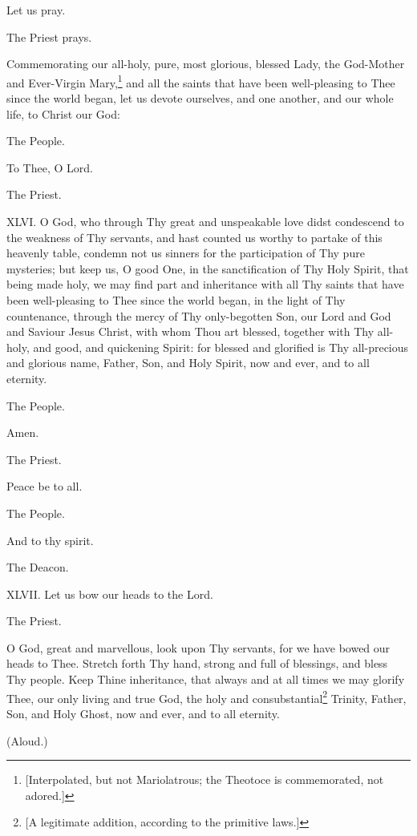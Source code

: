 Let us pray.

The Priest prays.

Commemorating our all-holy, pure, most glorious, blessed Lady, the God-Mother and Ever-Virgin Mary,\footnote{\par{}  [Interpolated, but not Mariolatrous; the Theotoce is commemorated, not adored.]} and all the saints that have been well-pleasing to Thee since the world began, let us devote ourselves, and one another, and our whole life, to Christ our God:

The People.

To Thee, O Lord.

The Priest.

XLVI. O God, who through Thy great and unspeakable love didst condescend to the weakness of Thy servants, and hast counted us worthy to partake of this heavenly table, condemn not us sinners for the participation of Thy pure mysteries; but keep us, O good One, in the sanctification of Thy Holy Spirit, that being made holy, we may find part and inheritance with all Thy saints that have been well-pleasing to Thee since the world began, in the light of Thy countenance, through the mercy of Thy only-begotten Son, our Lord and God and Saviour Jesus Christ, with whom Thou art blessed, together with Thy all-holy, and good, and quickening Spirit: for blessed and glorified is Thy all-precious and glorious name, Father, Son, and Holy Spirit, now and ever, and to all eternity.

The People.

Amen.

The Priest.

Peace be to all.

The People.

And to thy spirit.

The Deacon.

XLVII. Let us bow our heads to the Lord.

The Priest.

O God, great and marvellous, look upon Thy servants, for we have bowed our heads to Thee. Stretch forth Thy hand, strong and full of blessings, and bless Thy people. Keep Thine inheritance, that always and at all times we may glorify Thee, our only living and true God, the holy and consubstantial\footnote{\par{}  [A legitimate addition, according to the primitive laws.]} Trinity, Father, Son, and Holy Ghost, now and ever, and to all eternity.

(Aloud.)

